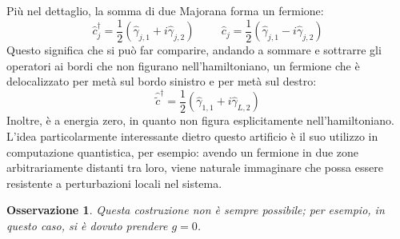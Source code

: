 \documentclass[11pt, a4paper]{scrartcl}
\theoremstyle{style}
\newtheorem{osservazione}{Osservazione}[section]
\theoremstyle{style1}
\numberwithin{equation}{subsection}
\begin{document}
Pi\`u nel dettaglio, la somma di due Majorana forma un fermione:
\[
\hat{c}_j^\dagger = \frac{1}{2}\left(\hat{\gamma}_{j,1} + i \hat{\gamma}_{j,2} \right) \hspace{1cm} \hat{c}_j = \frac{1}{2}\left(\hat{\gamma}_{j,1} - i \hat{\gamma}_{j , 2} \right)  
\] 
Questo significa che si pu\`o far comparire, andando a sommare e sottrarre gli operatori ai bordi che non figurano nell'hamiltoniano, un fermione che \`e delocalizzato per met\`a sul bordo sinistro e per met\`a sul destro:
\[
\hat{\tilde{c}}^\dagger = \frac{1}{2}\left(\hat{\gamma}_{1,1} + i \hat{\gamma}_{L,2} \right) 
\] 
Inoltre, \`e a energia zero, in quanto non figura esplicitamente nell'hamiltoniano.
L'idea particolarmente interessante dietro questo artificio \`e il suo utilizzo in computazione quantistica, per esempio: avendo un fermione in due zone arbitrariamente distanti tra loro, viene naturale immaginare che possa essere resistente a perturbazioni locali nel sistema.
\begin{osservazione}
Questa costruzione non \`e sempre possibile; per esempio, in questo caso, si \`e dovuto prendere $g=0$.
\end{osservazione}
\end{document}
